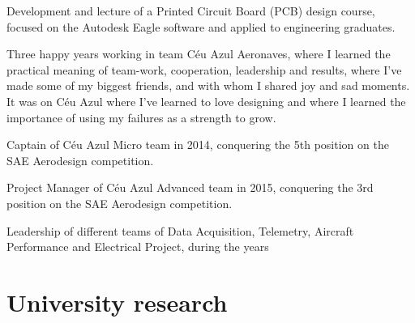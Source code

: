 \documentclass[A4]{deedy-resume} %
\begin{document}
\hfill
\begin{minipage}[t]{0.67\textwidth} %

\vspace{\topsep} %

\vspace{\topsep} %
\begin{tightitemize}
\item Development and lecture of a Printed Circuit Board (PCB) design course, focused on the Autodesk Eagle software and applied to engineering graduates. 
\end{tightitemize}

\vspace{\topsep} %
\begin{tightitemize}
\item Three happy years working in team Céu Azul Aeronaves, where I learned the practical meaning of team-work, cooperation, leadership and results, where I've made some of my biggest friends, and with whom I shared joy and sad moments. It was on Céu Azul where I've learned to love designing and where I learned the importance of using my failures as a strength to grow.\newline{}%

\begin{tightitemize}
\item Captain of Céu Azul Micro team in 2014, conquering the 5th position on the SAE Aerodesign competition.
\item Project Manager of Céu Azul Advanced team in 2015, conquering the 3rd position on the SAE Aerodesign competition.
\item Leadership of different teams of Data Acquisition, Telemetry, Aircraft Performance and Electrical Project, during the years
\end{tightitemize}

\end{tightitemize}

\section{University research}


\end{minipage}
\end{document}
